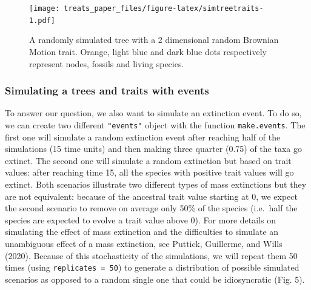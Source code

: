 \documentclass[
]{article}
\begin{document}
\begin{figure}
\centering
\texttt{[image: treats\_paper\_files/figure-latex/simtreetraits-1.pdf]}
\caption{A randomly simulated tree with a 2 dimensional random Brownian
Motion trait. Orange, light blue and dark blue dots respectively
represent nodes, fossils and living species.}
\end{figure}

\hypertarget{simulating-a-trees-and-traits-with-events}{%
\subsubsection{Simulating a trees and traits with
events}\label{simulating-a-trees-and-traits-with-events}}

To answer our question, we also want to simulate an extinction event. To
do so, we can create two different \texttt{"events"} object with the
function \texttt{make.events}. The first one will simulate a random
extinction event after reaching half of the simulations (15 time units)
and then making three quarter (0.75) of the taxa go extinct. The second
one will simulate a random extinction but based on trait values: after
reaching time 15, all the species with positive trait values will go
extinct. Both scenarios illustrate two different types of mass
extinctions but they are not equivalent: because of the ancestral trait
value starting at 0, we expect the second scenario to remove on average
only 50\% of the species (i.e.~half the species are expected to evolve a
trait value above 0). For more details on simulating the effect of mass
extinction and the difficulties to simulate an unambiguous effect of a
mass extinction, see Puttick, Guillerme, and Wills (2020). Because of
this stochasticity of the simulations, we will repeat them 50 times
(using \texttt{replicates\ =\ 50}) to generate a distribution of
possible simulated scenarios as opposed to a random single one that
could be idiosyncratic (Fig. 5).
\end{document}
